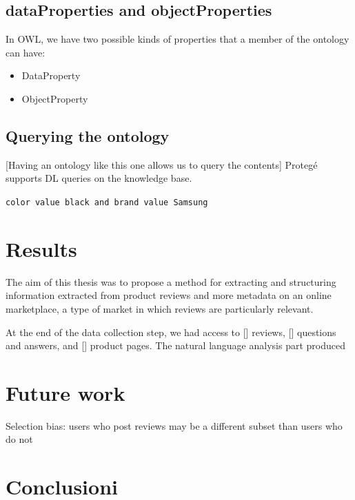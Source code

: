 \documentclass[LaM,binding=0.6cm]{sapthesis}
\begin{document}
\section{dataProperties and objectProperties}

In OWL, we have two possible kinds of properties that a member of the ontology can have:
\begin{itemize}
	\item DataProperty
	\item ObjectProperty
\end{itemize}

\section{Querying the ontology}

[Having an ontology like this one allows us to query the contents]
Protegé supports DL queries on the knowledge base.

\texttt{color value black and brand value Samsung}

\chapter{Results}

The aim of this thesis was to propose a method for extracting and structuring information extracted from product reviews and more metadata on an online marketplace, a type of market in which reviews are particularly relevant.

At the end of the data collection step, we had access to [] reviews, [] questions and answers, and [] product pages. The natural language analysis part produced 



\chapter{Future work}

Selection bias: users who post reviews may be a different subset than users who do not

\chapter{Conclusioni}


\backmatter
\cleardoublepage
{}
\end{document}
